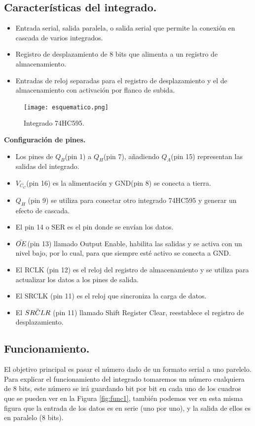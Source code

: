 \documentclass{article}
\begin{document}
\subsection{Características del integrado.}\label{caracteristicas}
 \begin{itemize}
 
\item Entrada serial, salida paralela, o salida serial que permite la conexión en cascada de varios integrados.
\item Registro de desplazamiento de 8 bits que alimenta a un registro de almacenamiento.
\item Entradas de reloj separadas para el registro de desplazamiento y el de almacenamiento con activación por flanco de subida.

\end{itemize}

\begin{figure}[h]
\texttt{[image: esquematico.png]}
\centering
\caption{Integrado 74HC595.}
\label{fig:int74HC959}
\end{figure}

\textbf{Configuración de pines.}
\newline
\begin{itemize}
\item Los pines de $Q_B$(pin 1) a $Q_H$(pin 7), añadiendo $Q_A$(pin 15) representan las salidas del integrado.
\item $V_C_C$(pin 16) es la alimentación y GND(pin 8) se conecta a tierra.
\item $Q_H$ (pin 9) se utiliza para conectar otro integrado 74HC595 y generar un efecto de cascada.
\item El pin 14 o SER es el pin donde se envían los datos.
\item $\Bar{OE}$(pin 13) llamado Output Enable, habilita las salidas y se activa con un nivel bajo, por lo cual, para que siempre esté activo se conecta a GND.
\item El RCLK (pin 12) es el reloj del registro de almacenamiento y se utiliza para actualizar los datos a los pines de salida.
\item El SRCLK (pin 11) es el reloj que sincroniza la carga de datos.
\item El $\Bar{SRCLR}$ (pin 11) llamado Shift Register Clear, reestablece el registro de desplazamiento.


\end{itemize}

\subsection{Funcionamiento.}\label{integrado funcionamiento}
El objetivo principal es pasar el número dado de un formato serial a uno parelelo. Para explicar el funcionamiento del integrado tomaremos un número cualquiera de 8 bits, este número se irá guardando bit por bit en cada uno de los cuadros que se pueden ver en la Figura \ref{fig:func1}, también podemos ver en esta misma figura que la entrada de los datos es en serie (uno por uno), y la salida de ellos es en paralelo (8 bits).
\end{document}
